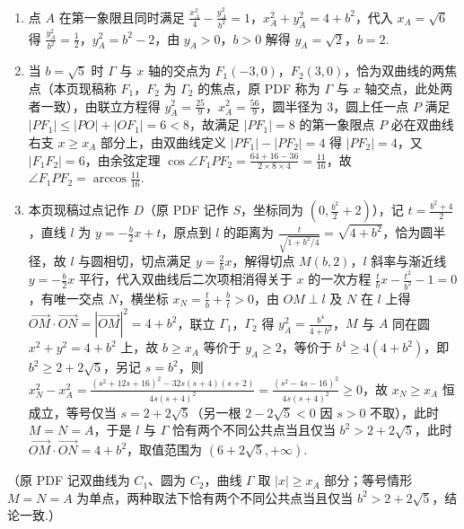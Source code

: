 \begin{solution}
\begin{enumerate}
\item 点 \(A\) 在第一象限且同时满足 \(\frac{x_A^2}{4}-\frac{y_A^2}{b^2}=1\)，\(x_A^2+y_A^2=4+b^2\)，代入 \(x_A=\sqrt6\) 得 \(\frac{y_A^2}{b^2}=\frac12\)，\(y_A^2=b^2-2\)，由 \(y_A>0\)，\(b>0\) 解得 \(y_A=\sqrt2\)，\(b=2\).
\item 当 \(b=\sqrt5\) 时 \(\Gamma\) 与 \(x\) 轴的交点为 \(F_1(-3,0)\)，\(F_2(3,0)\)，恰为双曲线的两焦点（本页现稿称 \(F_1\)，\(F_2\) 为 \(\Gamma_2\) 的焦点，原 PDF 称为 \(\Gamma\) 与 \(x\) 轴交点，此处两者一致），由联立方程得 \(y_A^2=\frac{25}{9}\)，\(x_A^2=\frac{56}{9}\)，圆半径为 \(3\)，圆上任一点 \(P\) 满足 \(|PF_1|\le|PO|+|OF_1|=6<8\)，故满足 \(|PF_1|=8\) 的第一象限点 \(P\) 必在双曲线右支 \(x\ge x_A\) 部分上，由双曲线定义 \(|PF_1|-|PF_2|=4\) 得 \(|PF_2|=4\)，又 \(|F_1F_2|=6\)，由余弦定理 \(\cos\angle F_1PF_2=\frac{64+16-36}{2\times8\times4}=\frac{11}{16}\)，故 \(\angle F_1PF_2=\arccos\frac{11}{16}\).
\item 本页现稿过点记作 \(D\)（原 PDF 记作 \(S\)，坐标同为 \(\left(0,\frac{b^2}{2}+2\right)\)），记 \(t=\frac{b^2+4}{2}\)，直线 \(l\) 为 \(y=-\frac{b}{2}x+t\)，原点到 \(l\) 的距离为 \(\frac{t}{\sqrt{1+b^2/4}}=\sqrt{4+b^2}\)，恰为圆半径，故 \(l\) 与圆相切，切点满足 \(y=\frac{2}{b}x\)，解得切点 \(M(b,2)\)，\(l\) 斜率与渐近线 \(y=-\frac{b}{2}x\) 平行，代入双曲线后二次项相消得关于 \(x\) 的一次方程 \(\frac{t}{b}x-\frac{t^2}{b^2}-1=0\)，有唯一交点 \(N\)，横坐标 \(x_N=\frac{t}{b}+\frac{b}{t}>0\)，由 \(OM\perp l\) 及 \(N\) 在 \(l\) 上得 \(\overrightarrow{OM}\cdot\overrightarrow{ON}=|\overrightarrow{OM}|^2=4+b^2\)，联立 \(\Gamma_1\)，\(\Gamma_2\) 得 \(y_A^2=\frac{b^4}{4+b^2}\)，\(M\) 与 \(A\) 同在圆 \(x^2+y^2=4+b^2\) 上，故 \(b\ge x_A\) 等价于 \(y_A\ge2\)，等价于 \(b^4\ge4(4+b^2)\)，即 \(b^2\ge2+2\sqrt5\)，另记 \(s=b^2\)，则 \(x_N^2-x_A^2=\frac{(s^2+12s+16)^2-32s(s+4)(s+2)}{4s(s+4)^2}=\frac{(s^2-4s-16)^2}{4s(s+4)^2}\ge0\)，故 \(x_N\ge x_A\) 恒成立，等号仅当 \(s=2+2\sqrt5\)（另一根 \(2-2\sqrt5<0\) 因 \(s>0\) 不取），此时 \(M=N=A\)，于是 \(l\) 与 \(\Gamma\) 恰有两个不同公共点当且仅当 \(b^2>2+2\sqrt5\)，此时 \(\overrightarrow{OM}\cdot\overrightarrow{ON}=4+b^2\)，取值范围为 \((6+2\sqrt5,+\infty)\).
\end{enumerate}（原 PDF 记双曲线为 \(C_1\)、圆为 \(C_2\)，曲线 \(\Gamma\) 取 \(|x|\ge x_A\) 部分；等号情形 \(M=N=A\) 为单点，两种取法下恰有两个不同公共点当且仅当 \(b^2>2+2\sqrt5\)，结论一致.）
\end{solution}

